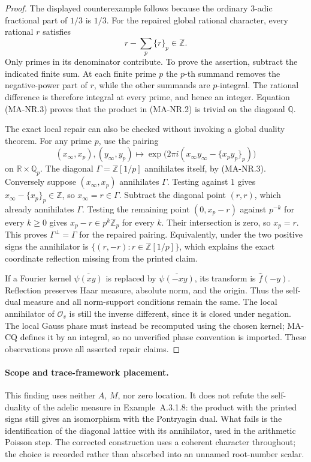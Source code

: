 \begin{proof}
The displayed counterexample follows because the ordinary
$3$-adic fractional part of $1/3$ is $1/3$.
For the repaired global rational character, every rational $r$
satisfies
\[
                    r-\sum_p\{r\}_p\in\mathbb Z.
 \tag{MA-NR.3}
\]
Only primes in its denominator contribute. To prove the assertion,
subtract the indicated finite sum. At each finite prime $p$ the
$p$-th summand removes the negative-power part of $r$, while the
other summands are $p$-integral. The rational difference is
therefore integral at every prime, and hence an integer.
Equation (MA-NR.3) proves that the product in (MA-NR.2)
is trivial on the diagonal $\mathbb Q$.

The exact local repair can also be checked without invoking a
global duality theorem. For any prime $p$, use the pairing
\[
 (x_\infty,x_p),(y_\infty,y_p)\longmapsto
    \exp\bigl(2\pi i(x_\infty y_\infty-\{x_py_p\}_p)\bigr)
 \tag{MA-NR.4}
\]
on $\mathbb R\times\mathbb Q_p$.
The diagonal $\Gamma=\mathbb Z[1/p]$ annihilates itself,
by (MA-NR.3). Conversely suppose $(x_\infty,x_p)$
annihilates $\Gamma$. Testing against $1$ gives
$x_\infty-\{x_p\}_p\in\mathbb Z$, so
$x_\infty=r\in\Gamma$.
Subtract the diagonal point $(r,r)$, which already annihilates
$\Gamma$. Testing the remaining point $(0,x_p-r)$ against
$p^{-k}$ for every $k\ge0$ gives
$x_p-r\in p^k\mathbb Z_p$ for every $k$.
Their intersection is zero, so $x_p=r$.
This proves $\Gamma^\perp=\Gamma$ for the repaired pairing.
Equivalently, under the two positive signs the annihilator is
$\{(r,-r):r\in\mathbb Z[1/p]\}$, which explains the exact
coordinate reflection missing from the printed claim.

If a Fourier kernel $\overline{\psi(xy)}$ is replaced by
$\overline{\psi(-xy)}$, its transform is $\widehat f(-y)$.
Reflection preserves Haar measure, absolute norm, and the origin.
Thus the self-dual measure and all norm-support conditions remain
the same. The local annihilator of $\mathcal O_v$ is still the
inverse different, since it is closed under negation. The local
Gauss phase must instead be recomputed using the chosen kernel;
MA-CQ defines it by an integral, so no unverified phase convention
is imported. These observations prove all asserted repair claims.
\end{proof}

\paragraph{Scope and trace-framework placement.}
This finding uses neither $A$, $M$, nor zero location.
It does not refute the self-duality of the adelic measure in
Example~A.3.1.8: the product with the printed signs still gives
an isomorphism with the Pontryagin dual. What fails is the
identification of the diagonal lattice with its annihilator,
used in the arithmetic Poisson step. The corrected construction
uses a coherent character throughout; the choice is recorded
rather than absorbed into an unnamed root-number scalar.

